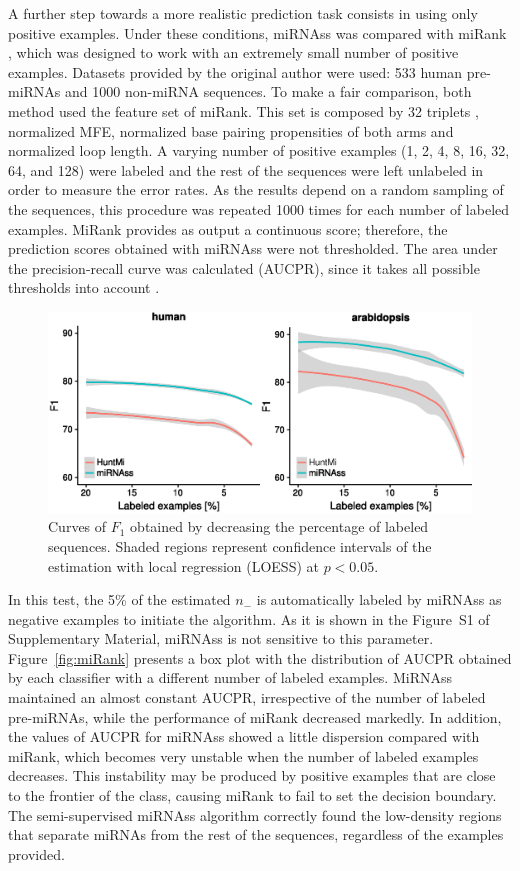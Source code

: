 \documentclass{article}
\begin{document}
A further step towards a more realistic prediction task consists in using only positive examples. Under these conditions, miRNAss was compared with miRank \citep{xu2008microrna}, which was designed to work with an extremely small number of positive examples. Datasets provided by the original author were used: 533 human pre-miRNAs and 1000 non-miRNA sequences. To make a fair comparison, both method used the feature set of miRank. This set is composed by 32 triplets \citep{xue2005classification}, normalized MFE, normalized base pairing propensities of both arms and normalized loop length. A varying number of positive examples (1, 2, 4, 8, 16, 32, 64, and 128) were labeled and the rest of the sequences were left unlabeled in order to measure the error rates. As the results depend on a random sampling of the sequences, this procedure was repeated 1000 times for each number of labeled examples. MiRank provides as output a continuous score; therefore, the prediction scores obtained with miRNAss were not thresholded. The area under the precision-recall curve was calculated (AUCPR), since it takes all possible thresholds into account \citep{bradley1997use}.
\begin{figure}[tpb]
	\centering
	\includegraphics[width=0.6\linewidth]{few_samples_huntmi.eps}
	\caption{Curves of $F_{1}$ obtained by decreasing the percentage of labeled sequences. Shaded regions represent confidence intervals of the estimation with local regression (LOESS) at $p < 0.05$.}
	\label{fig:fewSamples:huntmi}
\end{figure}

In this test, the 5\% of the estimated $n_{-}$ is automatically labeled by miRNAss as negative examples to initiate the algorithm. As it is shown in the Figure~S1 of Supplementary Material, miRNAss is not sensitive to this parameter. Figure~\ref{fig:miRank} presents a box plot with the distribution of AUCPR obtained by each classifier with a different number of labeled examples. MiRNAss maintained an almost constant AUCPR, irrespective of the number of labeled pre-miRNAs, while the performance of miRank decreased markedly. In addition, the values of AUCPR for miRNAss showed a little dispersion compared with miRank, which becomes very unstable when the number of labeled examples decreases. This instability may be produced by positive examples that are close to the frontier of the class, causing miRank to fail to set the decision boundary. The semi-supervised miRNAss algorithm correctly found the low-density regions that separate miRNAs from the rest of the sequences, regardless of the examples provided.
\end{document}
